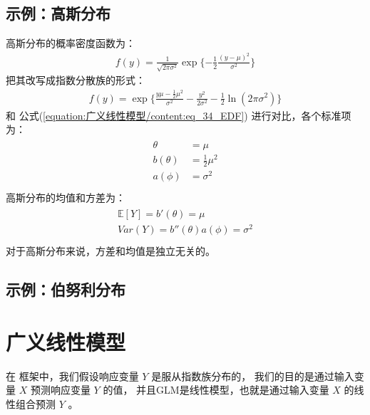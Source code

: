 \documentclass[letterpaper,10pt,english]{sphinxmanual}
\begin{document}
\subsection{示例：高斯分布}
\label{\detokenize{_u5e7f_u4e49_u7ebf_u6027_u6a21_u578b/content:id4}}
高斯分布的概率密度函数为：
\begin{equation}\label{equation:广义线性模型/content:广义线性模型/content:9}
\begin{split}f(y) = \frac{1}{\sqrt{2\pi\sigma^2}} \exp \{ -\frac{1}{2}\frac{(y-\mu)^2}{\sigma^2} \}\end{split}
\end{equation}
把其改写成指数分散族的形式：
\begin{equation}\label{equation:广义线性模型/content:广义线性模型/content:10}
\begin{split}f(y) = \exp \{ \frac{y\mu-\frac{1}{2}\mu^2}{\sigma^2} - \frac{y^2}{2\sigma^2}
- \frac{1}{2} \ln (2\pi\sigma^2) \}\end{split}
\end{equation}
和 公式(\ref{equation:广义线性模型/content:eq_34_EDF}) 进行对比，各个标准项为：
\begin{align}\label{equation:广义线性模型/content:广义线性模型/content:11}\!\begin{aligned}
\theta &=\mu\\
b(\theta) &= \frac{1}{2}\mu^2\\
a(\phi) &= \sigma^2\\
\end{aligned}\end{align}
高斯分布的均值和方差为：
\begin{align}\label{equation:广义线性模型/content:广义线性模型/content:12}\!\begin{aligned}
\mathbb{E}[Y]=b'(\theta) = \mu\\
Var(Y) = b''(\theta)a(\phi) = \sigma^2\\
\end{aligned}\end{align}
对于高斯分布来说，方差和均值是独立无关的。


\subsection{示例：伯努利分布}
\label{\detokenize{_u5e7f_u4e49_u7ebf_u6027_u6a21_u578b/content:id5}}

\section{广义线性模型}
\label{\detokenize{_u5e7f_u4e49_u7ebf_u6027_u6a21_u578b/content:id6}}
在  框架中，我们假设响应变量 \(Y\) 是服从指数族分布的，
我们的目的是通过输入变量 \(X\) 预测响应变量 \(Y\) 的值，
并且GLM是线性模型，也就是通过输入变量 \(X\) 的线性组合预测 \(Y\) 。
\end{document}
